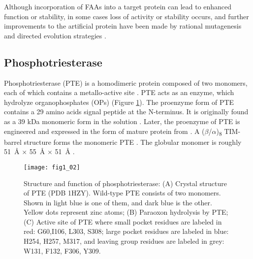 \begin{refsection}
Although incorporation of FAAs into a target
protein can lead to enhanced function or stability, in some cases loss of
activity or stability occurs, and further improvements to the artificial
protein have been made by rational mutagenesis \cite{Voloshchuk2007b} and
directed evolution strategies \cite{Montclare2006b}.

\subsection{Phosphotriesterase} 
\label{sec:pte-intro}

Phosphotriesterase (PTE) is a homodimeric protein composed of two monomers,
each of which contains a metallo-active site
\cite{Aubert2004b,Benning2001a,Benning1995}. PTE acts as an enzyme, which
hydrolyze organophosphates (OPs) \cite{Ghanem2005a} (Figure
\ref{fig:pte-structure}). The proenzyme form of PTE contains a 29 amino acids
signal peptide at the N-terminus. It is originally found as a 39 kDa monomeric
form in the solution \cite{Mulbry1989}. Later, the proenzyme of PTE is
engineered and expressed in the form of mature protein from . A
($\beta$/$\alpha$)\textsubscript{8} TIM-barrel structure forms the monomeric
PTE \cite{Roodveldt2005,Seibert2005}. The globular monomer is roughly
\SI{51}{\angstrom} $\times$ \SI{55}{\angstrom} $\times$ \SI{51}{\angstrom}
\cite{Hanusa2011}.
\begin{figure}[htbp] \centering \texttt{[image: fig1\_02]}
    \caption[Structure and function of phosphotriesterase: (A) Crystal
    structure of PTE (PDB 1HZY). Wild-type PTE consists of two monomers. Shown
    in light blue is one of them, and dark blue is the other. Yellow dots
    represent zinc atoms; (B) Paraoxon hydrolysis by PTE; (C) Active site of
    PTE where small pocket residues are labeled in red: G60,I106, L303, S308;
    large pocket residues are labeled in blue: H254, H257, M317, and leaving
    group residues are labeled in grey: W131, F132, F306, Y309.] {Structure and
        function of phosphotriesterase: (A) Crystal structure of PTE (PDB
        1HZY). Wild-type PTE consists of two monomers.  Shown in light blue is
        one of them, and dark blue is the other. Yellow dots represent zinc
        atoms; (B) Paraoxon hydrolysis by PTE;  (C)  Active site of PTE where
        small pocket residues are labeled in red: G60,I106, L303, S308; large
        pocket residues are labeled in blue: H254, H257, M317, and leaving
        group residues are labeled in grey: W131, F132, F306, Y309.}
\label{fig:pte-structure} 
\end{figure} 


\end{refsection}
